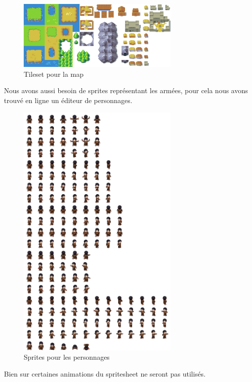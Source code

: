 \documentclass[a4paper,12pt]{article}
\begin{document}
\begin{figure}[H]
\begin{center}
  \includegraphics[width=0.7\textwidth]{images/tileset.png}
  \caption{Tileset pour la map}
 \end{center}

\end{figure}

Nous avons aussi besoin de sprites représentant les armées, pour cela nous avons trouvé en ligne un éditeur de personnages.

\begin{figure}[H]
\begin{center}
  \includegraphics[width=0.7\textwidth]{images/sprite.png}
  \caption{Sprites pour les personnages}
 \end{center}

\end{figure}

Bien sur certaines animations du spritesheet ne seront pas utilisés.



%
\end{document}

